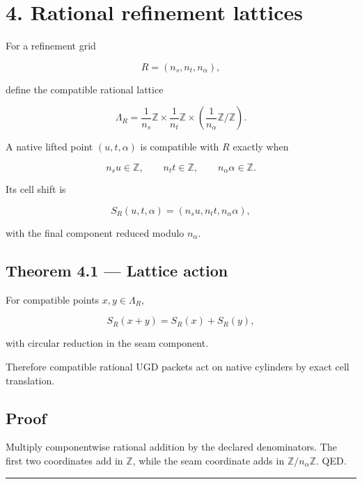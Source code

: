 \hypertarget{rational-refinement-lattices}{%
\section{4. Rational refinement lattices}\label{rational-refinement-lattices}}

For a refinement grid

\[
R=(n_s,n_t,n_\alpha),
\]

define the compatible rational lattice

\[
\boxed{
\Lambda_R
=
\frac1{n_s}\mathbb Z
\times
\frac1{n_t}\mathbb Z
\times
\left(
\frac1{n_\alpha}\mathbb Z/\mathbb Z
\right).
}
\tag{4.1}
\]

A native lifted point \((u,t,\alpha)\) is compatible with \(R\) exactly when

\[
n_su\in\mathbb Z,
\qquad
n_tt\in\mathbb Z,
\qquad
n_\alpha\alpha\in\mathbb Z.
\tag{4.2}
\]

Its cell shift is

\[
\boxed{
S_R(u,t,\alpha)
=
(n_su,n_tt,n_\alpha\alpha),
}
\tag{4.3}
\]

with the final component reduced modulo \(n_\alpha\).

\hypertarget{theorem-4.1-lattice-action}{%
\subsection{Theorem 4.1 --- Lattice action}\label{theorem-4.1-lattice-action}}

For compatible points \(x,y\in\Lambda_R\),

\[
S_R(x+y)=S_R(x)+S_R(y),
\tag{4.4}
\]

with circular reduction in the seam component.

Therefore compatible rational UGD packets act on native cylinders by exact cell
translation.

\hypertarget{proof-2}{%
\subsection{Proof}\label{proof-2}}

Multiply componentwise rational addition by the declared denominators. The
first two coordinates add in \(\mathbb Z\), while the seam coordinate adds in
\(\mathbb Z/n_\alpha\mathbb Z\). QED.

\begin{center}\rule{0.5\linewidth}{0.5pt}\end{center}

